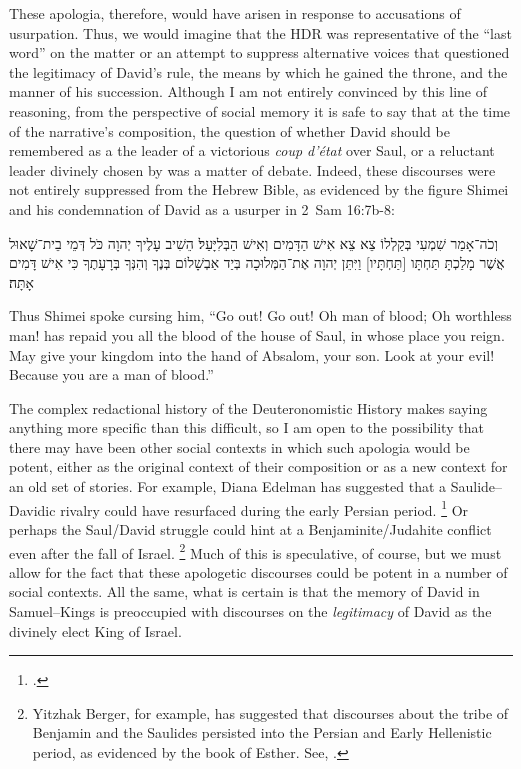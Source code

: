 These apologia, therefore, would have arisen in response to accusations of usurpation. Thus, we would imagine that the HDR was representative of the ``last word'' on the matter or an attempt to suppress alternative voices that questioned the legitimacy of David's rule, the means by which he gained the throne, and the manner of his succession. Although I am not entirely convinced by this line of reasoning, from the perspective of social memory it is safe to say that at the time of the narrative's composition, the question of whether David should be remembered as a the leader of a victorious \emph{coup d'état} over Saul, or a reluctant leader divinely chosen by \yahweh was a matter of debate. Indeed, these discourses were not entirely suppressed from the Hebrew Bible, as evidenced by the figure Shimei and his condemnation of David as a usurper in 2~Sam 16:7b-8:
\begin{hebrewtext}
    וְכֹה־אָמַר שִׁמְעִי בְּקַלְלוֹ צֵא צֵא אִישׁ הַדָּמִים וְאִישׁ הַבְּלִיָּעַל׃ 
    הֵשִׁיב עָלֶיךָ יְהוָה כֹּל דְּמֵי בֵית־שָׁאוּל אֲשֶׁר מָלַכְתָּ תַּחְתָּו [תַּחְתָּיו] וַיִּתֵּן יְהוָה אֶת־הַמְּלוּכָה בְּיַד אַבְשָׁלוֹם בְּנֶךָ וְהִנְּךָ בְּרָעָתֶךָ כִּי אִישׁ דָּמִים אָתָּה׃
\end{hebrewtext}
\begin{translation}
    Thus Shimei spoke cursing him, ``Go out! Go out! Oh man of blood; Oh worthless man! \yahweh has repaid you all the blood of the house of Saul, in whose place you reign. May \yahweh give your kingdom into the hand of Absalom, your son. Look at your evil! Because you are a man of blood.''
\end{translation}
\noindent
The complex redactional history of the Deuteronomistic History makes saying anything more specific than this difficult, so I am open to the possibility that there may have been other social contexts in which such apologia would be potent, either as the original context of their composition or as a new context for an old set of stories. For example, Diana Edelman has suggested that a Saulide--Davidic rivalry could have resurfaced during the early Persian period.%
    \footnote{\cite{edelman_dearman-graham2002}.}
Or perhaps the Saul/David struggle could hint at a Benjaminite/Judahite conflict even after the fall of Israel.%
    \footnote{Yitzhak Berger, for example, has suggested that discourses about the tribe of Benjamin and the Saulides persisted into the Persian and Early Hellenistic period, as evidenced by the book of Esther. See, \cite{berger_jbl2010}.}
Much of this is speculative, of course, but we must allow for the fact that these apologetic discourses could be potent in a number of social contexts. All the same, what is certain is that the memory of David in Samuel--Kings is preoccupied with discourses on the \emph{legitimacy} of David as the divinely elect King of Israel. 

